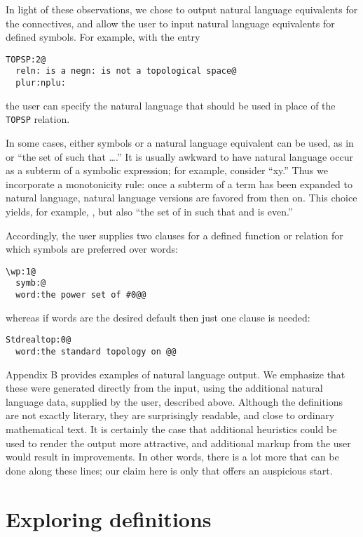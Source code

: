 \documentclass{llncs}
\begin{document}
In light of these observations, we chose to output natural language
equivalents for the connectives, and allow the user to input natural
language equivalents for defined symbols. For example, with the entry
\begin{center}
\begin{verbatim}
TOPSP:2@
  reln: is a negn: is not a topological space@
  plur:nplu:\end{verbatim}
\end{center}
the user can specify the natural language that should be used in place of the {\tt TOPSP} relation.

In some cases, either symbols or a natural language equivalent can be
used, as in  or ``the set of  such that \ldots.'' It is usually awkward to have natural
language occur as a subterm of a symbolic expression; for example,
consider ``xy.''
Thus we incorporate a monotonicity rule: once a subterm of a term has
been expanded to natural language, natural language versions are
favored from then on. This choice yields, for example, , but also ``the set of  in 
such that  and  is even.''

Accordingly, the user supplies two clauses for a defined function or relation for which symbols are preferred over words:
\begin{verbatim}
\wp:1@
  symb:@
  word:the power set of #0@@
\end{verbatim}
whereas if words are the desired default then just one clause is needed:
\begin{verbatim}
Stdrealtop:0@
  word:the standard topology on @@
\end{verbatim}

Appendix B provides examples of natural language output. We emphasize
that these were generated directly from the  input, using
the additional natural language data, supplied by the user, described
above. Although the definitions are not exactly literary, they are
surprisingly readable, and close to ordinary mathematical text. It is
certainly the case that additional heuristics could be used to render
the output more attractive, and additional markup from the user would
result in improvements. In other words, there is a lot more that can
be done along these lines; our claim here is only that 
offers an auspicious start.

\section{Exploring definitions}
\end{document}
